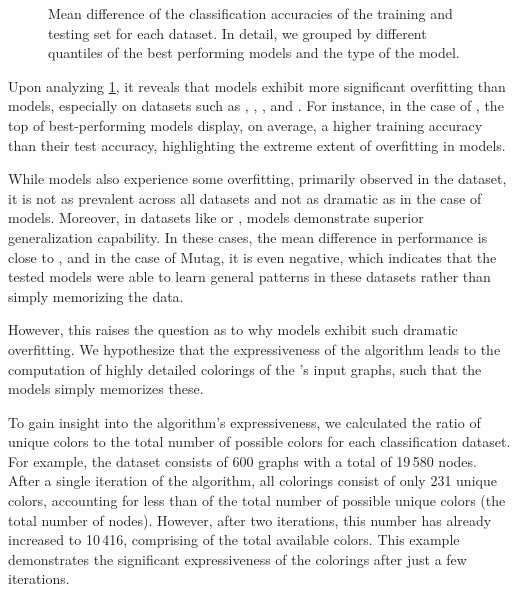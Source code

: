\begin{figure}[!b]
\begin{subfigure}[b]{0.3\textwidth}
		\vspace*{-4ex} 
	\end{subfigure}
	\caption{Mean difference of the classification accuracies of the training and testing set for each dataset. In detail, we grouped by different quantiles of the best performing models and the type of the model.}
	\label{fig:performance_diff}
\end{figure}

Upon analyzing \cref{fig:performance_diff}, it reveals that \wlnn models exhibit more significant overfitting than \gnn models, especially on datasets such as \enzymes, \mutag, \proteins, and \reddit. For instance, in the case of \enzymes, the top  of best-performing \wlnn models display, on average, a  higher training accuracy than their test accuracy, highlighting the extreme extent of overfitting in \wlnn models.

While \gnn models also experience some overfitting, primarily observed in the \nci dataset, it is not as prevalent across all datasets and not as dramatic as in the case of \wlnn models. Moreover, in datasets like \mutag or \reddit, \gnn models demonstrate superior generalization capability. In these cases, the mean difference in performance is close to , and in the case of Mutag, it is even negative, which indicates that the tested \gnn models were able to learn general patterns in these datasets rather than simply memorizing the data.

However, this raises the question as to why \wlnn models exhibit such dramatic overfitting. We hypothesize that the expressiveness of the \wl algorithm leads to the computation of highly detailed colorings of the \wlnn's input graphs, such that the models simply memorizes these.

To gain insight into the algorithm's expressiveness, we calculated the ratio of unique colors to the total number of possible colors for each classification dataset. For example, the \enzymes dataset consists of 600 graphs with a total of 19\,580 nodes. After a single iteration of the \wl algorithm, all colorings consist of only 231 unique colors, accounting for less than  of the total number of possible unique colors (the total number of nodes). However, after two iterations, this number has already increased to 10\,416, comprising  of the total available colors. This example demonstrates the significant expressiveness of the colorings after just a few iterations.

